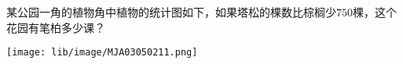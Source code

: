 某公园一角的植物角中植物的统计图如下，如果塔松的棵数比棕榈少$750$棵，这个花园有笔柏多少课？
\begin{center}
    \texttt{[image: lib/image/MJA03050211.png]}
\end{center}